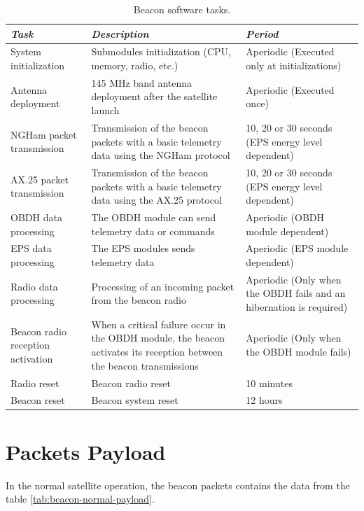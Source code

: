 \begin{table}[!h]
	\begin{center}
		\begin{tabular}{L{0.2\textwidth} C{0.4\textwidth} C{0.3\textwidth}}
			\toprule[1.5pt]
			\textit{Task} & \textit{Description} & \textit{Period} \\
			\midrule
			System initialization & Submodules initialization (CPU, memory, radio, etc.) & Aperiodic (Executed only at initializations) \\
			Antenna deployment & 145 MHz band antenna deployment after the satellite launch & Aperiodic (Executed once) \\
			NGHam packet transmission & Transmission of the beacon packets with a basic telemetry data using the NGHam protocol & 10, 20 or 30 seconds (EPS energy level dependent) \\
			AX.25 packet transmission & Transmission of the beacon packets with a basic telemetry data using the AX.25 protocol & 10, 20 or 30 seconds (EPS energy level dependent) \\
			OBDH data processing & The OBDH module can send telemetry data or commands & Aperiodic (OBDH module dependent) \\
			EPS data processing & The EPS modules sends telemetry data & Aperiodic (EPS module dependent) \\
			Radio data processing & Processing of an incoming packet from the beacon radio & Aperiodic (Only when the OBDH fails and an hibernation is required) \\
			Beacon radio reception activation & When a critical failure occur in the OBDH module, the beacon activates its reception between the beacon transmissions & Aperiodic (Only when the OBDH module fails) \\
			Radio reset & Beacon radio reset & 10 minutes \\
			Beacon reset & Beacon system reset & 12 hours \\
			\bottomrule[1.5pt]
		\end{tabular}
		\caption{Beacon software tasks.}
		\label{tab:sw_tasks}
	\end{center}
\end{table}

\section{Packets Payload}

In the normal satellite operation, the beacon packets contains the data from the table \ref{tab:beacon-normal-payload}.

